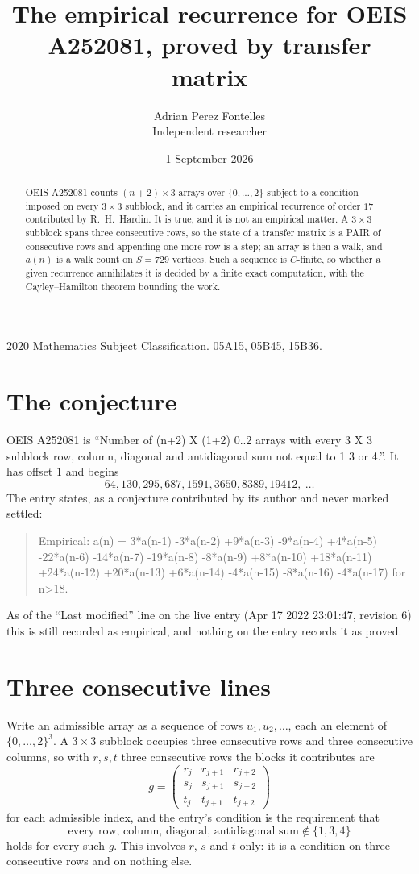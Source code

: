 \documentclass[11pt,a4paper]{article}
\title{The empirical recurrence for OEIS A252081, proved by transfer matrix}
\author{Adrian Perez Fontelles\\ \small Independent researcher}
\date{1 September 2026}
\theoremstyle{plain}
\theoremstyle{definition}
\begin{document}
\maketitle

\begin{abstract}
OEIS A252081 counts $(n+2)\times3$ arrays over $\{0,\dots,2\}$ subject to a condition imposed on
every $3\times3$ subblock, and it carries an empirical recurrence of order $17$
contributed by R.~H.~Hardin. It is true, and it is not an empirical matter. A $3\times3$
subblock spans three consecutive rows, so the state of a transfer matrix is a PAIR of
consecutive rows and appending one more row is a step; an array is then a walk, and
$a(n)$ is a walk count on $S=729$ vertices. Such a sequence is $C$-finite, so whether a given
recurrence annihilates it is decided by a finite exact computation, with the Cayley--Hamilton
theorem bounding the work.
\end{abstract}

\noindent\small 2020 Mathematics Subject Classification. 05A15, 05B45, 15B36.\normalsize

\section{The conjecture}

OEIS A252081 is ``Number of (n+2) X (1+2) 0..2 arrays with every 3 X 3 subblock row, column, diagonal and antidiagonal sum not equal to 1 3 or 4.''. It has offset $1$ and begins
\[
64, 130, 295, 687, 1591, 3650, 8389, 19412,\ \dots
\]
The entry states, as a conjecture contributed by its author and never marked settled:
\begin{quote}
Empirical: a(n) = 3*a(n-1) -3*a(n-2) +9*a(n-3) -9*a(n-4) +4*a(n-5) -22*a(n-6) -14*a(n-7) -19*a(n-8) -8*a(n-9) +8*a(n-10) +18*a(n-11) +24*a(n-12) +20*a(n-13) +6*a(n-14) -4*a(n-15) -8*a(n-16) -4*a(n-17) for n>18.
\end{quote}
As of the ``Last modified'' line on the live entry (Apr 17 2022 23:01:47, revision 6) this is still
recorded as empirical, and nothing on the entry records it as proved.

\section{Three consecutive lines}

Write an admissible array as a sequence of rows $u_1,u_2,\dots$, each an element of
$\{0,\dots,2\}^{3}$. A $3\times3$ subblock occupies three consecutive rows and
three consecutive columns, so with $r,s,t$ three consecutive rows the blocks it
contributes are
\[
g=\begin{pmatrix}r_j&r_{j+1}&r_{j+2}\\ s_j&s_{j+1}&s_{j+2}\\ t_j&t_{j+1}&t_{j+2}\end{pmatrix}
\]
for each admissible index, and the entry's condition is the requirement that
\[
\text{every row, column, diagonal, antidiagonal sum} \notin \{1,3,4\}
\]
holds for every such $g$. This involves $r$, $s$ and $t$ only: it is a condition on
three consecutive rows and on nothing else.
\end{document}

